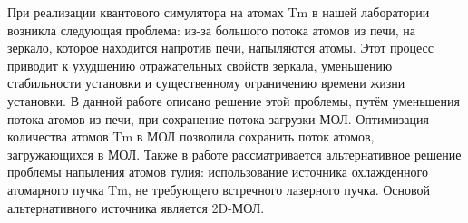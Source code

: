 При реализации квантового симулятора на атомах Tm в нашей лаборатории возникла следующая проблема: из-за большого потока атомов из печи, на зеркало, которое находится напротив печи, напыляются атомы. Этот процесс приводит к ухудшению отражательных свойств зеркала, уменьшению стабильности установки и существенному ограничению времени жизни установки. В данной работе описано решение этой проблемы, путём уменьшения потока атомов из печи, при сохранение потока загрузки МОЛ. Оптимизация количества атомов Tm в МОЛ позволила сохранить поток атомов, загружающихся в МОЛ. Также в работе рассматривается альтернативное решение проблемы напыления атомов тулия: использование источника охлажденного атомарного пучка Tm, не требующего встречного лазерного пучка. Основой альтернативного источника является 2D-МОЛ.